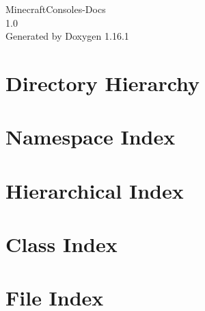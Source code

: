 \documentclass[twoside]{book}
\newcommand{\+}{\discretionary{\mbox{\scriptsize$\hookleftarrow$}}{}{}}
\newcommand{\clearemptydoublepage}{%
    \newpage{\pagestyle{empty}\cleardoublepage}%
  }
\begin{document}
  \raggedbottom
    \hypersetup{pageanchor=false,
                bookmarksnumbered=true,
                pdfencoding=unicode
               }
  \begin{titlepage}
  \vspace*{7cm}
  \begin{center}%
  {\Large Minecraft\+Consoles-\/\+Docs}\\
  [1ex]\large 1.\+0 \\
  \vspace*{1cm}
  {\large Generated by Doxygen 1.16.1}\\
  \end{center}
  \end{titlepage}
  \clearemptydoublepage
  \tableofcontents
  \clearemptydoublepage
  \hypersetup{pageanchor=true}






\chapter{Directory Hierarchy}

\chapter{Namespace Index}

\chapter{Hierarchical Index}

\chapter{Class Index}

\chapter{File Index}

\end{document}
